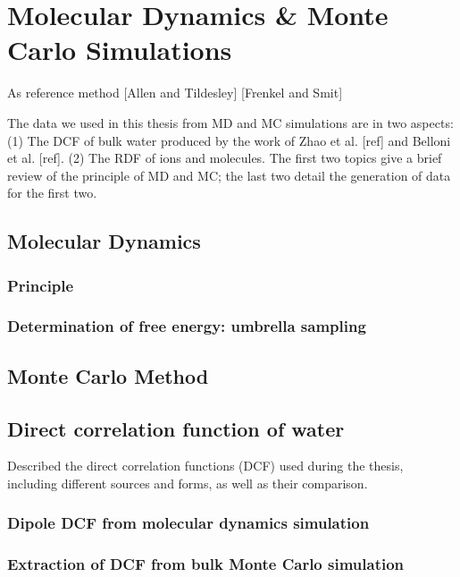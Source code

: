 
\chapter{Molecular Dynamics & Monte Carlo Simulations\label{chpt:reference-method}}

As reference method {[}Allen and Tildesley{]} {[}Frenkel and Smit{]}

The data we used in this thesis from \acs{MD} and \acs{MC}
simulations are in two aspects: (1) The \acs{DCF} of bulk water produced
by the work of Zhao et al. {[}ref{]} and Belloni et al. {[}ref{]}.
(2) The \acf{RDF} of ions and molecules. The first two topics give
a brief review of the principle of \acs{MD} and \acs{MC}; the last
two detail the generation of data for the first two.


\section{Molecular Dynamics}


\subsection{Principle}


\subsection{Determination of free energy: umbrella sampling}


\section{Monte Carlo Method}


\section{Direct correlation function of water}

Described the direct correlation functions (\acs{DCF}) used during
the thesis, including different sources and forms, as well as their
comparison.


\subsection{Dipole DCF from molecular dynamics simulation}


\subsection{Extraction of DCF from bulk Monte Carlo simulation}

